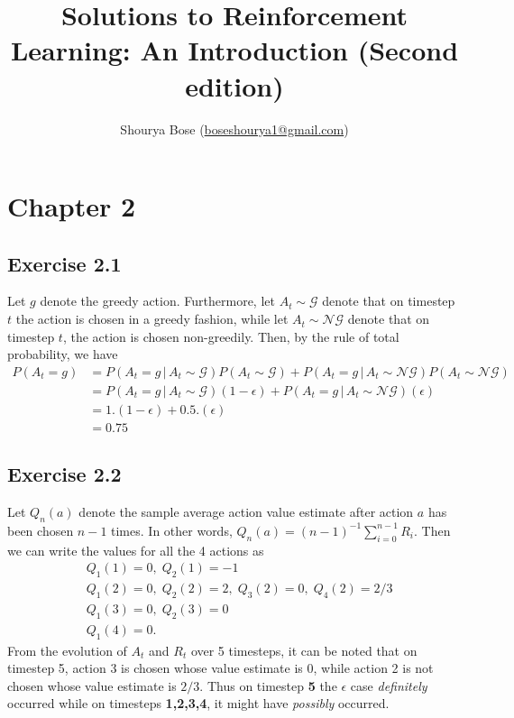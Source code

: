 \documentclass[10pt]{article}
\title{Solutions to Reinforcement Learning: An Introduction (Second edition)}
\author{Shourya Bose (\url{boseshourya1@gmail.com})}
\newcommand{\mcal}[1]{\mathcal{#1}}
\begin{document}
	\maketitle
	\tableofcontents
	\newpage
	\section{Chapter 2}
	\subsection*{Exercise 2.1}
	\label{ss:2.1}
	Let $g$ denote the greedy action. Furthermore, let $A_t\sim\mcal{G}$ denote that on timestep $t$ the action is chosen in a greedy fashion, while let $A_t \sim \mcal{NG}$ denote that on timestep $t$, the action is chosen non-greedily. Then, by the rule of total probability, we have
	\begin{align*}
	P(A_t = g) &= P(A_t=g \, \vert \, A_t\sim\mcal{G}) P(A_t \sim \mcal{G}) +  P(A_t=g \, \vert \, A_t\sim\mcal{NG}) P(A_t \sim \mcal{NG})\\
	&= P(A_t=g \, \vert \, A_t\sim\mcal{G})(1-\epsilon) + P(A_t=g \, \vert \, A_t\sim\mcal{NG})(\epsilon)\\
	&= 1.(1-\epsilon) + 0.5.(\epsilon)\\
	&= 0.75
	\end{align*}
	\subsection*{Exercise 2.2}
	\label{ss:2.2}
	Let $Q_n(a)$ denote the sample average action value estimate after action $a$ has been chosen $n-1$ times. In other words, $Q_n(a) = (n-1)^{-1}\sum_{i=0}^{n-1}	R_i$. Then we can write the values for all the 4 actions as
	\begin{align*}
	& Q_1(1) = 0, \; Q_2(1) = -1\\
	& Q_1(2) = 0,\; Q_2(2) = 2,\; Q_3(2) = 0,\; Q_4(2) = 2/3\\
	& Q_1(3) = 0,\; Q_2(3) = 0\\
	& Q_1(4) = 0.
	\end{align*}
	From the evolution of $A_t$ and $R_t$ over 5 timesteps, it can be noted that on timestep 5, action 3 is chosen whose value estimate is 0, while action 2 is not chosen whose value estimate is $2/3$. Thus on timestep \textbf{5} the $\epsilon$ case \emph{definitely} occurred while on timesteps \textbf{1,2,3,4}, it might have \emph{possibly} occurred.
\end{document}
